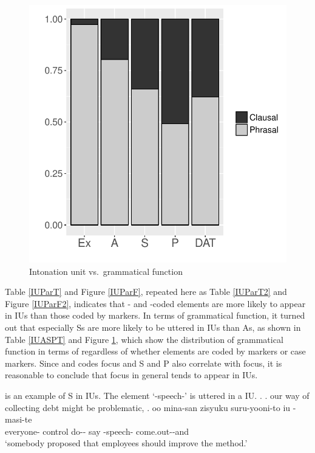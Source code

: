 \begin{figure}
	\begin{center}
	\includegraphics[width=.5\textwidth]{figure/IUASP.pdf}
	\caption{Intonation unit vs.~grammatical function}
	\label{IUASPF}
	\end{center}
\end{figure}

Table \ref{IUParT} and Figure \ref{IUParF},
repeated here as Table \ref{IUParT2} and Figure \ref{IUParF2},
indicates that - and -coded elements are more likely to
appear in  IUs than those coded by  markers.
In terms of grammatical function,
it turned out that especially Ss are more likely to be uttered in
 IUs than As,
as shown in Table \ref{IUASPT} and Figure \ref{IUASPF},
which show the distribution of grammatical function in terms of  regardless of whether elements are coded by  markers or case markers.
Since  and  codes focus and
S and P also correlate with focus,
it is reasonable to conclude that
focus in general tends to appear in  IUs.

\Next[b] is an example of S in  IUs.
The element  `-speech-'
is uttered in a  IU.
%
\ex.\label{S00M0221_ohanashi}
 \a. our way of collecting debt might be problematic,
 \bg. oo mina-san \tp{\dvline} zisyuku suru-yooni-to iu \tp{\dvline}  -masi-te \tp{\dvline} \\
 	 everyone- {} control do-- say {} -speech- come.out--and {} \\
 		`somebody proposed that employees should improve the method.'

